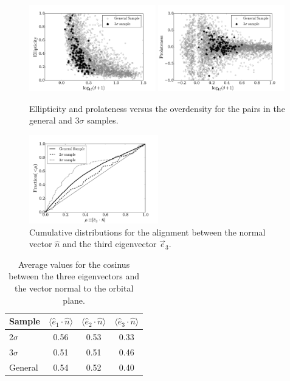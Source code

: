 \documentclass{emulateapj}
\begin{document}
\begin{figure}
\begin{center}
  \includegraphics[width=0.49\textwidth]{ELL_delta_scatter.pdf}
  \includegraphics[width=0.49\textwidth]{PROL_delta_scatter.pdf}
\end{center}
\caption{Ellipticity and prolateness versus the overdensity for the pairs
  in the general and $3\sigma$ samples.  \label{fig:delta_ELL_PROL}}  
\end{figure}


\begin{figure}
\begin{center}
  \includegraphics[width=0.50\textwidth]{alignments_e3.pdf} 
\end{center}
\caption{Cumulative distributions for the alignment between the normal
  vector $\hat{n}$ and the third eigenvector $\vec{e}_3$.
    \label{fig:alignment}}  
\end{figure}

\begin{table}
\begin{center}
\begin{tabular}{lccc}\hline\hline
Sample & $\langle\hat{e}_1\cdot \hat{n}\rangle$ & $\langle\hat{e}_2\cdot \hat{n}\rangle$ & $\langle\hat{e}_3\cdot \hat{n}\rangle$\\\hline
2$\sigma$ & 0.56 & 0.53 &  0.33\\
3$\sigma$ & 0.51 & 0.51 &  0.46\\
General & 0.54 & 0.52 & 0.40\\\hline
\end{tabular}
\caption{Average values for the cosinus between the three eigenvectors and the vector normal to the orbital plane.
\label{table:mu}}
\end{center}
\end{table}
\end{document}
